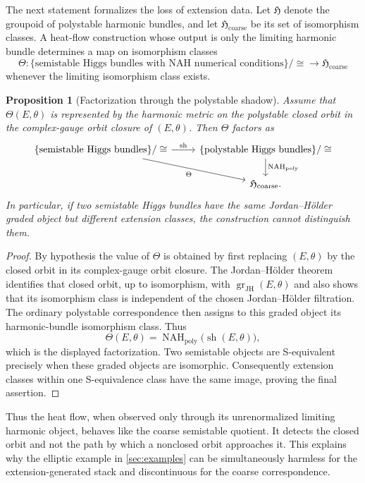 \documentclass[11pt,reqno]{amsart}
\newtheorem{proposition}[theorem]{Proposition}
\theoremstyle{definition}
\theoremstyle{remark}
\newcommand{\poly}{\mathrm{poly}}
\begin{document}
The next statement formalizes the loss of extension data.  Let $\mathfrak H$ denote the groupoid of polystable harmonic bundles, and let $\mathfrak H_{\mathrm{coarse}}$ be its set of isomorphism classes.  A heat-flow construction whose output is only the limiting harmonic bundle determines a map on isomorphism classes
\[
  \Theta:\{\text{semistable Higgs bundles with NAH numerical conditions}\}/\cong
  \longrightarrow \mathfrak H_{\mathrm{coarse}}
\]
whenever the limiting isomorphism class exists.

\begin{proposition}[Factorization through the polystable shadow]\label{prop:heat-flow-factors-shadow}
Assume that $\Theta(E,\theta)$ is represented by the harmonic metric on the polystable closed orbit in the complex-gauge orbit closure of $(E,\theta)$.  Then $\Theta$ factors as
\[
\begin{tikzcd}
\{\text{semistable Higgs bundles}\}/\cong
  \arrow[r,"\operatorname{sh}"]
  \arrow[dr,"\Theta"']
&
\{\text{polystable Higgs bundles}\}/\cong
  \arrow[d,"\operatorname{NAH}_{\poly}"]
\\
&
\mathfrak H_{\mathrm{coarse}} .
\end{tikzcd}
\]
In particular, if two semistable Higgs bundles have the same Jordan--H\"older graded object but different extension classes, the construction cannot distinguish them.
\end{proposition}

\begin{proof}
By hypothesis the value of $\Theta$ is obtained by first replacing
$(E,\theta)$ by the closed orbit in its complex-gauge orbit closure.
The Jordan--H\"older theorem identifies that closed orbit, up to
isomorphism, with $\operatorname{gr}_{\mathrm{JH}}(E,\theta)$ and also
shows that its isomorphism class is independent of the chosen
Jordan--H\"older filtration.  The ordinary polystable correspondence
then assigns to this graded object its harmonic-bundle isomorphism
class.  Thus
\[
 \Theta(E,\theta)
 =\operatorname{NAH}_{\poly}
   \bigl(\operatorname{sh}(E,\theta)\bigr),
\]
which is the displayed factorization.  Two semistable objects are
S-equivalent precisely when these graded objects are isomorphic.
Consequently extension classes within one S-equivalence class have the
same image, proving the final assertion.
\end{proof}

Thus the heat flow, when observed only through its unrenormalized limiting harmonic object, behaves like the coarse semistable quotient.  It detects the closed orbit and not the path by which a nonclosed orbit approaches it.  This explains why the elliptic example in \cref{sec:examples} can be simultaneously harmless for the extension-generated stack and discontinuous for the coarse correspondence.
\end{document}
